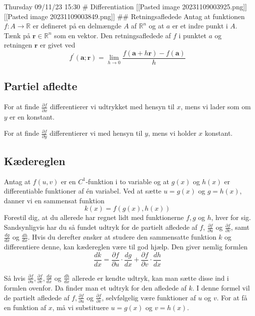 Thursday 09/11/23 15:30 \# Differentiation {[}{[}Pasted image
20231109003925.png{]}{]} {[}{[}Pasted image 20231109003849.png{]}{]}
\#\# Retningsafledede Antag at funktionen
\(f: A \rightarrow \mathbb{R}\) er defineret på en delmængde \(A\) af
\(\mathbb{R}^n\) og at \(a\) er et indre punkt i \(A\). Tænk på
\(\mathbf{r} \in \mathbb{R}^n\) som en vektor. Den retningsafledede af
\(f\) i punktet \(a\) og retningen \(\mathbf{r}\) er givet ved \[
f^{\prime}(\mathbf{a} ; \mathbf{r})=\lim _{h \rightarrow 0} \frac{f(\mathbf{a}+h \mathbf{r})-f(\mathbf{a})}{h}
\]

\hypertarget{partiel-afledte}{%
\subsection{Partiel afledte}\label{partiel-afledte}}

For at finde \(\frac{\partial f}{\partial x}\) differentierer vi
udtrykket med hensyn til \(x\), mens vi lader som om \(y\) er en
konstant.

For at finde \(\frac{\partial f}{\partial y}\) differentierer vi med
hensyn til \(y\), mens vi holder \(x\) konstant.

\hypertarget{kuxe6dereglen}{%
\subsection{Kædereglen}\label{kuxe6dereglen}}

Antag at \(f(u, v)\) er en \(C^1\)-funktion i to variable og at \(g(x)\)
og \(h(x)\) er differentiable funktioner af én variabel. Ved at sætte
\(u=g(x)\) og \(g=h(x)\), danner vi en sammensat funktion \[
k(x)=f(g(x), h(x))
\] Forestil dig, at du allerede har regnet lidt med funktionerne
\(f, g\) og \(h\), hver for sig. Sandsynligvis har du så fundet udtryk
for de partielt afledede af \(f\), \(\frac{\partial f}{\partial u}\) og
\(\frac{\partial f}{\partial v}\), samt \(\frac{d g}{d x}\) og
\(\frac{d h}{d x}\). Hvis du derefter ønsker at studere den sammensatte
funktion \(k\) og differentiere denne, kan kædereglen være til god
hjælp. Den giver nemlig formlen \[
\frac{d k}{d x}=\frac{\partial f}{\partial u} \cdot \frac{d g}{d x}+\frac{\partial f}{\partial v} \cdot \frac{d h}{d x}
\]

Så hvis
\(\frac{\partial f}{\partial u}, \frac{\partial f}{\partial v}, \frac{d g}{d x}\)
og \(\frac{d h}{d x}\) allerede er kendte udtryk, kan man sætte disse
ind i formlen ovenfor. Da finder man et udtryk for den afledede af
\(k\). I denne formel vil de partielt afledede af
\(f, \frac{\partial f}{\partial u}\) og
\(\frac{\partial f}{\partial v}\), selvfølgelig være funktioner af \(u\)
og \(v\). For at få en funktion af \(x\), må vi substituere \(u=g(x)\)
og \(v=h(x)\).

